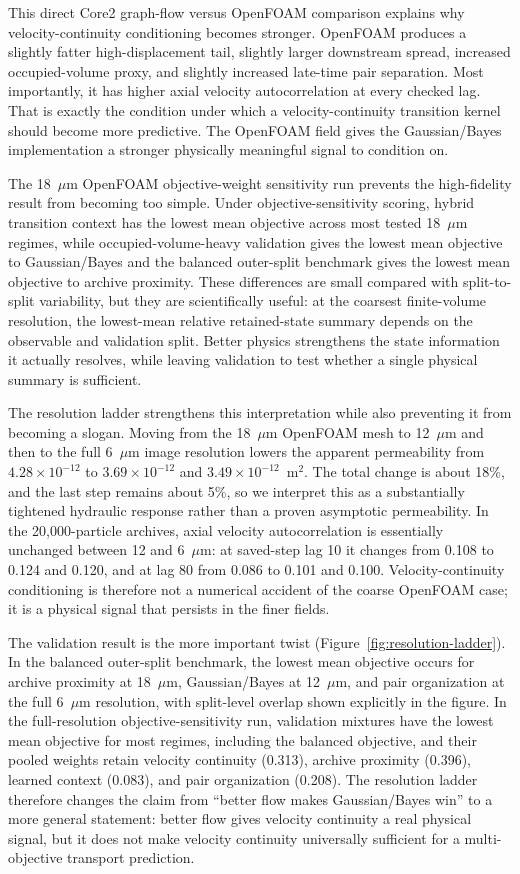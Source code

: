 \documentclass[11pt]{article}
\newcommand{\gb}{Gaussian/Bayes}
\begin{document}
This direct Core2 graph-flow versus OpenFOAM comparison explains why velocity-continuity conditioning becomes stronger. OpenFOAM produces a slightly fatter high-displacement tail, slightly larger downstream spread, increased occupied-volume proxy, and slightly increased late-time pair separation. Most importantly, it has higher axial velocity autocorrelation at every checked lag. That is exactly the condition under which a velocity-continuity transition kernel should become more predictive. The OpenFOAM field gives the \gb{} implementation a stronger physically meaningful signal to condition on.

The 18~$\mu$m OpenFOAM objective-weight sensitivity run prevents the high-fidelity result from becoming too simple. Under objective-sensitivity scoring, hybrid transition context has the lowest mean objective across most tested 18~$\mu$m regimes, while occupied-volume-heavy validation gives the lowest mean objective to \gb{} and the balanced outer-split benchmark gives the lowest mean objective to archive proximity. These differences are small compared with split-to-split variability, but they are scientifically useful: at the coarsest finite-volume resolution, the lowest-mean relative retained-state summary depends on the observable and validation split. Better physics strengthens the state information it actually resolves, while leaving validation to test whether a single physical summary is sufficient.

The resolution ladder strengthens this interpretation while also preventing it from becoming a slogan. Moving from the 18~$\mu$m OpenFOAM mesh to 12~$\mu$m and then to the full 6~$\mu$m image resolution lowers the apparent permeability from $4.28\times10^{-12}$ to $3.69\times10^{-12}$ and $3.49\times10^{-12}$~m$^2$. The total change is about 18\%, and the last step remains about 5\%, so we interpret this as a substantially tightened hydraulic response rather than a proven asymptotic permeability. In the 20,000-particle archives, axial velocity autocorrelation is essentially unchanged between 12 and 6~$\mu$m: at saved-step lag 10 it changes from 0.108 to 0.124 and 0.120, and at lag 80 from 0.086 to 0.101 and 0.100. Velocity-continuity conditioning is therefore not a numerical accident of the coarse OpenFOAM case; it is a physical signal that persists in the finer fields.

The validation result is the more important twist (Figure~\ref{fig:resolution-ladder}). In the balanced outer-split benchmark, the lowest mean objective occurs for archive proximity at 18~$\mu$m, \gb{} at 12~$\mu$m, and pair organization at the full 6~$\mu$m resolution, with split-level overlap shown explicitly in the figure. In the full-resolution objective-sensitivity run, validation mixtures have the lowest mean objective for most regimes, including the balanced objective, and their pooled weights retain velocity continuity (0.313), archive proximity (0.396), learned context (0.083), and pair organization (0.208). The resolution ladder therefore changes the claim from ``better flow makes \gb{} win'' to a more general statement: better flow gives velocity continuity a real physical signal, but it does not make velocity continuity universally sufficient for a multi-objective transport prediction.
\end{document}
